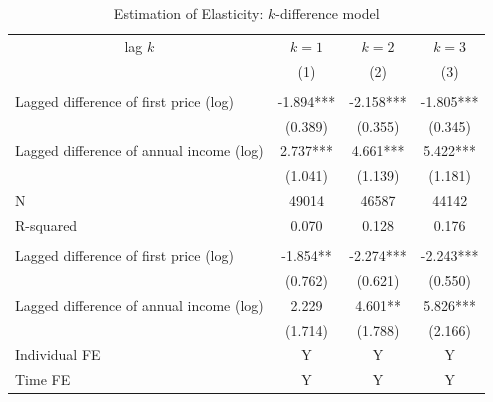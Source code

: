 \documentclass[
  11pt,
  a4paper,
]{article}
\begin{document}
  \begin{table}

  \caption{\label{tab:kablekDiffElasticity}Estimation of Elasticity: $k$-difference model}
  \centering
  \fontsize{7}{9}\selectfont
  \begin{threeparttable}
  \begin{tabular}[t]{lccc}
  \toprule
  \multicolumn{1}{c}{lag $k$} & \multicolumn{1}{c}{$k = 1$} & \multicolumn{1}{c}{$k = 2$} & \multicolumn{1}{c}{$k = 3$} \\
  \cmidrule(l{3pt}r{3pt}){1-1} \cmidrule(l{3pt}r{3pt}){2-2} \cmidrule(l{3pt}r{3pt}){3-3} \cmidrule(l{3pt}r{3pt}){4-4}
   & (1) & (2) & (3)\\
  \midrule
  \addlinespace[0.3em]
  \multicolumn{4}{l}{\textbf{Overall Elasticity}}\\
  \hspace{1em}Lagged difference of first price (log) & -1.894*** & -2.158*** & -1.805***\\
  \hspace{1em} & (0.389) & (0.355) & (0.345)\\
  \hspace{1em}Lagged difference of annual income (log) & 2.737*** & 4.661*** & 5.422***\\
  \hspace{1em} & (1.041) & (1.139) & (1.181)\\
  \hspace{1em}N & 49014 & 46587 & 44142\\
  \hspace{1em}R-squared & 0.070 & 0.128 & 0.176\\
  \addlinespace[0.3em]
  \multicolumn{4}{l}{\textbf{Intensive-Margin Elasticity}}\\
  \hspace{1em}Lagged difference of first price (log) & -1.854** & -2.274*** & -2.243***\\
  \hspace{1em} & (0.762) & (0.621) & (0.550)\\
  \hspace{1em}Lagged difference of annual income (log) & 2.229 & 4.601** & 5.826***\\
  \hspace{1em} & (1.714) & (1.788) & (2.166)\\
  \hspace{1em}Individual FE & Y & Y & Y\\
  \hspace{1em}Time FE & Y & Y & Y\\

\end{tabular}
\end{threeparttable}
\end{table}
\end{document}
